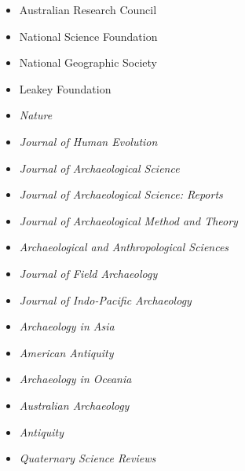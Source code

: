 \begin{itemize}[noitemsep, font=$\bullet$\scshape\bfseries]

\item  Australian Research Council

\item  National Science Foundation

\item  National Geographic Society

\item  Leakey Foundation 

\item  \textit{Nature}

\item  \textit{Journal of Human Evolution}

\item  \textit{Journal of Archaeological Science}

\item  \textit{Journal of Archaeological Science: Reports}

\item  \textit{Journal of Archaeological Method and Theory}

\item  \textit{Archaeological and Anthropological Sciences}

\item  \textit{Journal of Field Archaeology}

\item  \textit{Journal of Indo-Pacific Archaeology}

\item  \textit{Archaeology in Asia}

\item  \textit{American Antiquity}

\item  \textit{Archaeology in Oceania}

\item  \textit{Australian Archaeology}

\item  \textit{Antiquity}

\item  \textit{Quaternary Science Reviews}

\end{itemize}
